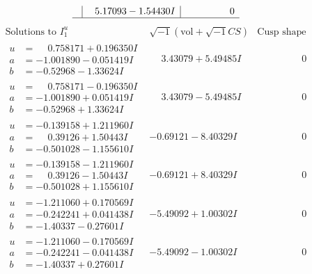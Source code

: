 \documentclass[1p]{elsarticle_modified}
\theoremstyle{definition}
\newcommand{\I}{\sqrt{-1}}
\begin{document}
$$\begin{array}{c|c|c}
 & \phantom{-}5.17093 - 1.54430 I & \phantom{-0.000000 } 0\\
 \hline 
 \end{array}$$\newpage$$\begin{array}{c|c|c}  
\text{Solutions to }I^u_{1}& \I (\text{vol} + \sqrt{-1}CS) & \text{Cusp shape}\\
 \hline 
\begin{aligned}
u &= \phantom{-}0.758171 + 0.196350 I \\
a &= -1.001890 - 0.051419 I \\
b &= -0.52968 - 1.33624 I\end{aligned}
 & \phantom{-}3.43079 + 5.49485 I & \phantom{-0.000000 } 0 \\ \hline\begin{aligned}
u &= \phantom{-}0.758171 - 0.196350 I \\
a &= -1.001890 + 0.051419 I \\
b &= -0.52968 + 1.33624 I\end{aligned}
 & \phantom{-}3.43079 - 5.49485 I & \phantom{-0.000000 } 0 \\ \hline\begin{aligned}
u &= -0.139158 + 1.211960 I \\
a &= \phantom{-}0.39126 + 1.50443 I \\
b &= -0.501028 - 1.155610 I\end{aligned}
 & -0.69121 - 8.40329 I & \phantom{-0.000000 } 0 \\ \hline\begin{aligned}
u &= -0.139158 - 1.211960 I \\
a &= \phantom{-}0.39126 - 1.50443 I \\
b &= -0.501028 + 1.155610 I\end{aligned}
 & -0.69121 + 8.40329 I & \phantom{-0.000000 } 0 \\ \hline\begin{aligned}
u &= -1.211060 + 0.170569 I \\
a &= -0.242241 + 0.041438 I \\
b &= -1.40337 - 0.27601 I\end{aligned}
 & -5.49092 + 1.00302 I & \phantom{-0.000000 } 0 \\ \hline\begin{aligned}
u &= -1.211060 - 0.170569 I \\
a &= -0.242241 - 0.041438 I \\
b &= -1.40337 + 0.27601 I\end{aligned}
 & -5.49092 - 1.00302 I & \phantom{-0.000000 } 0 \\ \hline\begin{aligned}

\end{aligned}
\end{array}$$
\end{document}
